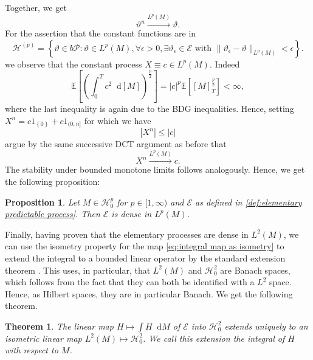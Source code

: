 \documentclass[11pt,a4paper,twoside,openany]{report}
\newcommand{\diff}{\mathop{}\!\mathrm{d}}
\theoremstyle{plain} %
\newtheorem{theorem}{Theorem}[chapter]
\newtheorem{proposition}[proposition]{Proposition}
\theoremstyle{definition} %
\theoremstyle{remark} %
\let\parencite\authnumparencite
\begin{document}
Together, we get
\begin{equation}
    \vartheta^n\overset{L^p(M)}{\to}\vartheta.
\end{equation}
For the assertion that the constant functions are in
\begin{equation}
        \mathcal{H}^{(p)}=\left\{ \vartheta\in b\mathcal{P}:\vartheta\in L^p(M),\forall \epsilon>0, \exists \vartheta_{\epsilon}\in \mathcal{E}\text{ with }\lVert \vartheta_{\epsilon}-\vartheta\rVert_{L^p(M)}<\epsilon\right\}.
\end{equation}
we observe that the constant process \(X\equiv c\in L^p(M)\). Indeed 
\begin{equation}
    \mathbb{E}[\left(\int_0^Tc^2\diff [M]\right)^{\frac{p}{2}}]=|c|^{p}\mathbb{E}[[M]_T^{\frac{p}{2}}]<\infty,
\end{equation}
where the last inequality is again due to the BDG inequalities. Hence, setting  \(X^n=c1_{\left\{0\right\}}+c1_{(0,n]}\) for which we have 
\begin{equation}
    |X^n|\leq |c|
\end{equation}
argue by the same successive DCT argument as before that 
\begin{equation}
    X^n\overset{L^p(M)}{\to}c.
\end{equation}
 The stability under bounded monotone limits follows analogously. Hence, we get the following proposition:
\begin{proposition}\label{prop:density of E in Lp(M) via monotone class}
    Let \(M\in\mathcal{H}^p_0\) for \(p\in[1,\infty)\) and \(\mathcal{E}\) as defined in \cref{def:elementary predictable process}. Then \(\mathcal{E}\) is dense in \(L^p(M)\).
\end{proposition}
\bigbreak
Finally, having proven that the elementary processes are dense in \(L^2(M)\), we can use the isometry property for the map \cref{eq:integral map as isometry} to extend the integral to a bounded linear operator by the standard extension theorem \parencite[Prop.~5.4]{SteinShakarchi2005RealAnalysis}. This uses, in particular, that \(L^2(M)\) and \(\mathcal{H}_0^2\) are Banach spaces, which follows from the fact that they can both be identified with a \(L^2\) space. Hence, as Hilbert spaces, they are in particular Banach.
We get the following theorem.
\begin{theorem}\label{def:square-integrable stochastic integral}
    The linear map \(H\mapsto \int H\diff M\) of \(\mathcal{E}\) into \(\mathcal{H}_0^2\) extends uniquely to an isometric linear map \(L^2(M)\mapsto\mathcal{H}_0^2\). We call this extension the integral of \(H\) with respect to \(M\).
\end{theorem}
\end{document}
